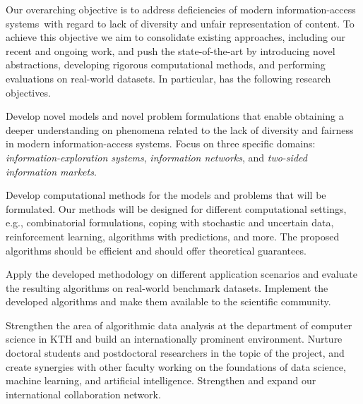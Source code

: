 \documentclass[a4paper,11pt]{article}
\begin{document}
Our overarching objective is to address deficiencies of modern information-access systems~with 
regard to lack of diversity and unfair representation of content.
To achieve this objective we aim to consolidate existing approaches, 
including our recent and ongoing work,  
and push the state-of-the-art 
by intro\-duc\-ing novel abstractions, 
developing rigorous computational methods, and 
performing evaluations on real-world datasets.
In particular, {\acronym} has the following research objectives. 
%
\begin{description}
\setlength{\itemsep}{-4pt}
\item[{Models and problems:}]
Develop novel models and novel problem formulations that enable 
obtaining a deeper understanding on phenomena related 
to the lack of diversity and fairness in  modern informa\-tion-access systems.
Focus on three specific domains: 
\emph{information-exploration systems}, \emph{information networks}, and 
\emph{two-sided information markets}.

\item[{Algorithms:}]
Develop computational methods for the models and problems that will be formulated.
Our methods will be designed for different computational settings, 
e.g., combinatorial formulations, coping with stochastic and uncertain data, 
reinforcement learning, algorithms with predictions, and more.
The proposed algorithms should be efficient %
and should offer theoretical guarantees.


\item[{Applications:}]
Apply the developed methodology on different application scenarios 
and evaluate the resulting algorithms on real-world benchmark datasets.
Implement the developed algorithms and make them available to the scientific community.

\item[{Research environment in KTH:}]
Strengthen the area of algorithmic data analysis 
at the department of computer science in KTH
and build an internationally prominent environment. 
Nurture doctoral students and postdoctoral researchers in the topic of the project,
and create synergies with other faculty working on 
the foundations of data science, machine learning, and artificial intelligence.
Strengthen and expand our international collaboration network.
\end{description}
\end{document}
